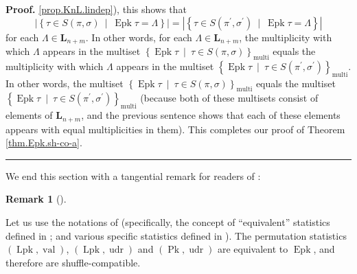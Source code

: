 \documentclass[numbers=enddot,12pt,final,onecolumn,notitlepage]{scrartcl}%
\theoremstyle{definition}
\newtheorem{remk}[theo]{Remark}
\newenvironment{remark}[1][]
{\begin{remk}[#1]\begin{leftbar}}
{\end{leftbar}\end{remk}}
\newenvironment{proof}[1][Proof]{\noindent\textbf{#1.} }{\ \rule{0.5em}{0.5em}}
\newenvironment{verlong}{}{}
\begin{document}
\begin{proof}
\ref{prop.KnL.lindep}), this shows that%
\[
\left\vert \left\{  \tau\in S\left(  \pi,\sigma\right)  \ \mid
\ \operatorname{Epk}\tau=\Lambda\right\}  \right\vert =\left\vert \left\{
\tau\in S\left(  \pi^{\prime},\sigma^{\prime}\right)  \ \mid
\ \operatorname{Epk}\tau=\Lambda\right\}  \right\vert
\]
for each $\Lambda\in\mathbf{L}_{n+m}$.
\begin{verlong}
In other words, for each $\Lambda\in\mathbf{L}_{n+m}$,
the multiplicity with which $\Lambda$ appears in the multiset
$\left\{
\operatorname{Epk} \tau   \ \mid\ \tau\in S\left(  \pi
,\sigma\right)  \right\}  _{\operatorname*{multi}}$ equals the
multiplicity with which $\Lambda$ appears in the multiset
$\left\{  \operatorname{Epk} \tau   \ \mid\ \tau\in S\left(
\pi^{\prime},\sigma^{\prime}\right)  \right\}  _{\operatorname*{multi}}$.
\end{verlong}
In other words, the multiset $\left\{
\operatorname{Epk} \tau   \ \mid\ \tau\in S\left(  \pi
,\sigma\right)  \right\}  _{\operatorname*{multi}}$ equals the multiset
\newline
$\left\{  \operatorname{Epk} \tau   \ \mid\ \tau\in S\left(
\pi^{\prime},\sigma^{\prime}\right)  \right\}  _{\operatorname*{multi}}$
(because both of these multisets consist of elements of $\mathbf{L}_{n+m}$,
and the previous sentence shows that each of these elements appears with
equal multiplicities in them). This completes our proof of Theorem
\ref{thm.Epk.sh-co-a}.
\end{proof}

We end this section with a tangential remark for readers of
\cite{part1}:

\begin{remark}
\label{rmk.Epk.equivalents}Let us use the notations of \cite{part1}
(specifically, the concept of ``equivalent'' statistics defined
in \cite[Section 3.1]{part1}; and various specific statistics
defined in \cite[Section 2.2]{part1}).
The permutation statistics $\left(
\operatorname*{Lpk},\operatorname{val}\right)  $, $\left(
\operatorname*{Lpk},\operatorname*{udr}\right)  $ and $\left(
\operatorname*{Pk},\operatorname*{udr}\right)  $ are equivalent to
$\operatorname{Epk}$, and therefore are shuffle-compatible.
\end{remark}
\end{document}
